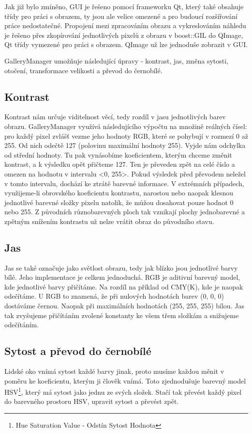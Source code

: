 \documentclass[11pt,twoside,a4paper]{book}
\begin{document}
\indent
Jak již bylo zmíněno, GUI je řešeno pomocí frameworku Qt, který také obsahuje třídy pro práci s obrazem, ty jsou ale velice omezené a pro budoucí rozšířování práce nedostatečné. Propojení mezi zpracováním obrazu a vykreslováním náhledu je řešeno přes zkopírování jednotlivých pixelů z obrazu v boost::GIL do QImage, Qt třídy vymezené pro práci s obrazem. QImage už lze jednoduše zobrazit v GUI.

\indent
GalleryManager umožňuje následující úpravy - kontrast, jas, změna sytosti, otočení, transformace velikosti a převod do černobílé.

\subsection{Kontrast}
\noindent
Kontrast nám určuje viditelnost věcí, tedy rozdíl v jasu jednotlivých barev obrazu. GalleryManager využívá následujícího výpočtu na množině reálných čísel: pro každý pixel zvlášť vezme jeho hodnoty RGB, které se pohybují v rozmezí 0 až 255. Od nich odečtě 127 (polovinu maximální hodnoty 255). Vyjde nám odchylka od střední hodnoty. Tu pak vynásobíme koeficientem, kterým chceme změnit kontrast, a k výsledku opět přičteme 127. Ten je převeden zpět na celé číslo a omezen na hodnotu v intervalu <0, 255>. Pokud výsledek před převodem neležel v tomto intervalu, dochází ke ztrátě barevné informace. V extrémních případech, využijeme-li obrovského koeficientu kontrastu, narostou nebo naopak klesnou jednotlivé barevné složky pixelu natolik, že můžou dosahovat pouze hodnot 0 nebo 255. Z původních různobarevných ploch tak vznikají plochy jednobarevné a zpětným snížením kontrastu už nelze vrátit obraz do původního stavu.

\subsection{Jas}
\noindent
Jas se také označuje jako světlost obrazu, tedy jak blízko jsou jednotlivé barvy bílé. Jeho implementace je celkem jednoduchá. RGB je aditivní barevný model, kde jednotlivé barvy přičítáme. Na rozdíl na příklad od CMY(K), kde je naopak odečítáme. U RGB to znamená, že při nulových hodnotách barev (0, 0, 0) dostáváme černou. Naopak při maximálních hodnotách (255, 255, 255) bílou. Jas tak zvyšujeme přičítáním zvolené konstanty ke všem třem složkám a snižujeme odečítáním.

\subsection{Sytost a převod do černobílé}
\noindent
Lidské oko vnímá sytost každé barvy jinak, proto musíme každou měnit v poměru ke koeficientu, kterým ji člověk vnímá. Toto zjednodušuje barevný model HSV\footnote{Hue Saturation Value - Odstín Sytost Hodnota}\cite{graphmodel}, který má sytost jako jednu ze svých složek. Stačí tak převést každý pixel do barevného prostoru HSV, upravit sytost a převést zpět.
\end{document}
